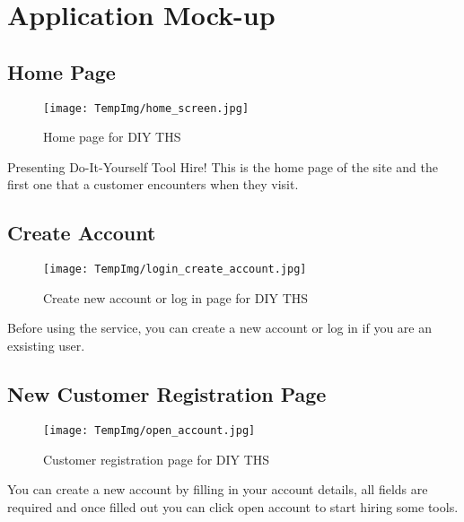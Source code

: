 \documentclass[fontsize=11pt]{extarticle}
\numberwithin{figure}{section} %
\numberwithin{table}{section}%
\begin{document}
\newpage

\hypertarget{application-mock-up}{%
\section{Application Mock-up}\label{application-mock-up}}

\hypertarget{home-page}{%
\subsection{Home Page}\label{home-page}}

\begin{figure}[H]
      \centering
      \texttt{[image: TempImg/home\_screen.jpg]}
      \caption{Home page for DIY THS}
 \end{figure}

Presenting Do-It-Yourself Tool Hire! This is the home page of the site
and the first one that a customer encounters when they visit.

\hypertarget{create-account}{%
\subsection{Create Account}\label{create-account}}

\begin{figure}[H]
      \centering
      \texttt{[image: TempImg/login\_create\_account.jpg]}
      \caption{Create new account or log in page for DIY THS}
 \end{figure}

Before using the service, you can create a new account or log in if you
are an exsisting user.

\hypertarget{new-customer-registration-page}{%
\subsection{New Customer Registration
Page}\label{new-customer-registration-page}}

\begin{figure}[H]
      \centering
      \texttt{[image: TempImg/open\_account.jpg]}
      \caption{Customer registration page for DIY THS}
 \end{figure}

You can create a new account by filling in your account details, all
fields are required and once filled out you can click open account to
start hiring some tools.
\end{document}
